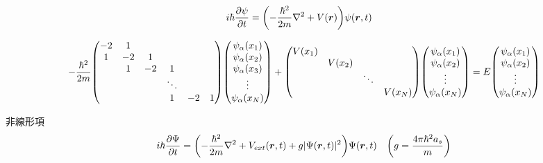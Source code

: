 \documentclass[uplatex,dvipdfmx,a4paper,11pt]{jlreq}
\newcommand{\rr}{\bm{r}}
\theoremstyle{definition}
\begin{document}
\begin{definition}[TDSE]
  \begin{align}
    i\hbar\pdv{\psi}{t} & = \qty(-\frac{\hbar^2}{2m}\laplacian + V(\rr))\psi(\rr, t)
  \end{align}
\end{definition}
\begin{align}
  - \frac{\hbar^2}{2m}
  \mqty(-2     & 1      &        &         &    &    \\
  1            & -2     & 1      &         &    &    \\
               & 1      & -2     & 1       &    &    \\
               &        &        & \ddots  &    &    \\
               &        &        & 1       & -2 & 1)
  \mqty(\psi_\alpha(x_1)                             \\ \psi_\alpha(x_2) \\ \psi_\alpha(x_3) \\ \vdots \\ \psi_\alpha(x_N)) +
  \mqty(V(x_1) &        &        &                   \\
               & V(x_2) &        &                   \\
               &        & \ddots &                   \\
               &        &        & V(x_N))
  \mqty(\psi_\alpha(x_1)                             \\ \psi_\alpha(x_2) \\ \vdots \\ \psi_\alpha(x_N))
  =
  E\mqty(\psi_\alpha(x_1)                            \\ \psi_\alpha(x_2) \\ \vdots \\ \psi_\alpha(x_N))
\end{align}

\begin{definition}
  非線形項
  \begin{align}
    i\hbar\pdv{\Psi}{t} & = \qty(-\frac{\hbar^2}{2m}\laplacian + V_{ext}(\rr, t) + g|\Psi(\rr, t)|^2)\Psi(\rr, t) & \qty(g = \frac{4\pi\hbar^2 a_s}{m})
  \end{align}

\end{definition}
\end{document}
